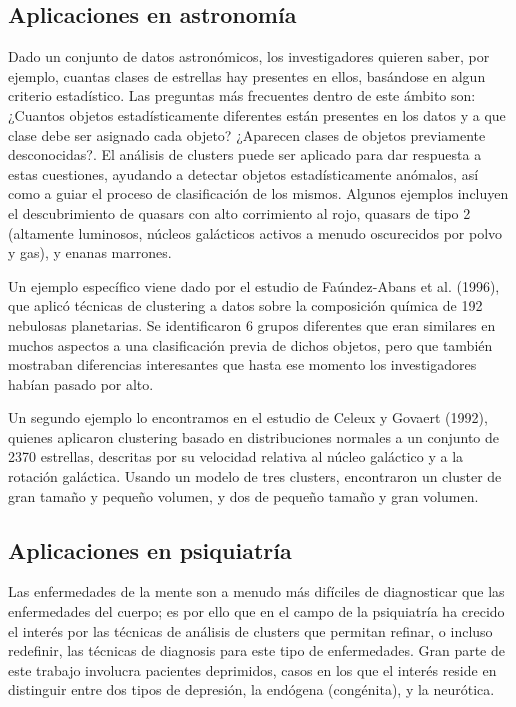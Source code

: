 \subsection{Aplicaciones en astronomía}

Dado un conjunto de datos astronómicos, los investigadores quieren saber, por ejemplo, cuantas clases de estrellas hay presentes en ellos, basándose en algun criterio estadístico. Las preguntas más frecuentes dentro de este ámbito son: ¿Cuantos objetos estadísticamente diferentes están presentes en los datos y a que clase debe ser asignado cada objeto? ¿Aparecen clases de objetos previamente desconocidas?. El análisis de clusters puede ser aplicado para dar respuesta a estas cuestiones, ayudando a detectar objetos estadísticamente anómalos, así como a guiar el proceso de clasificación de los mismos. Algunos ejemplos incluyen el descubrimiento de quasars con alto corrimiento al rojo, quasars de tipo 2 (altamente luminosos, núcleos galácticos activos a menudo oscurecidos por polvo y gas), y enanas marrones.

Un ejemplo específico viene dado por el estudio de Faúndez-Abans et al. (1996), que aplicó técnicas de clustering a datos sobre la composición química de 192 nebulosas planetarias. Se identificaron 6 grupos diferentes que eran similares en muchos aspectos a una clasificación previa de dichos objetos, pero que también mostraban diferencias interesantes que hasta ese momento los investigadores habían pasado por alto.

Un segundo ejemplo lo encontramos en el estudio de Celeux y Govaert (1992), quienes aplicaron clustering basado en distribuciones normales a un conjunto de 2370 estrellas, descritas por su velocidad relativa al núcleo galáctico y a la rotación galáctica. Usando un modelo de tres clusters, encontraron un cluster de gran tamaño y pequeño volumen, y dos de pequeño tamaño y gran volumen.

\subsection{Aplicaciones en psiquiatría}

Las enfermedades de la mente son a menudo más difíciles de diagnosticar que las enfermedades del cuerpo; es por ello que en el campo de la psiquiatría ha crecido el interés por las técnicas de análisis de clusters que permitan refinar, o incluso redefinir, las técnicas de diagnosis para este tipo de enfermedades. Gran parte de este trabajo involucra pacientes deprimidos, casos en los que el interés reside en distinguir entre dos tipos de depresión, la endógena (congénita), y la neurótica.

